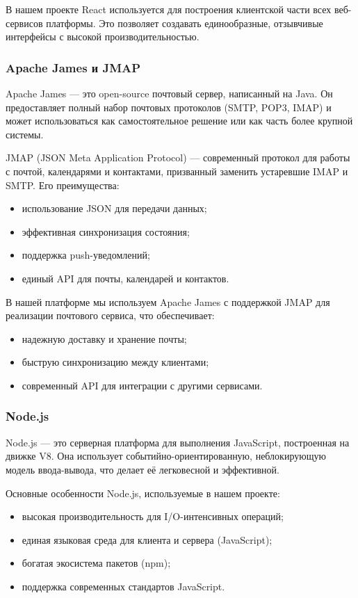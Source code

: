 В нашем проекте React используется для построения клиентской части всех веб-сервисов платформы. Это позволяет создавать единообразные, отзывчивые интерфейсы с высокой производительностью.

\subsubsection{Apache James и JMAP}
Apache James — это open-source почтовый сервер, написанный на Java. Он предоставляет полный набор почтовых протоколов (SMTP, POP3, IMAP) и может использоваться как самостоятельное решение или как часть более крупной системы.

JMAP (JSON Meta Application Protocol) — современный протокол для работы с почтой, календарями и контактами, призванный заменить устаревшие IMAP и SMTP. Его преимущества:
\begin{itemize}
\item использование JSON для передачи данных;
\item эффективная синхронизация состояния;
\item поддержка push-уведомлений;
\item единый API для почты, календарей и контактов.
\end{itemize}

В нашей платформе мы используем Apache James с поддержкой JMAP для реализации почтового сервиса, что обеспечивает:
\begin{itemize}
\item надежную доставку и хранение почты;
\item быструю синхронизацию между клиентами;
\item современный API для интеграции с другими сервисами.
\end{itemize}

\subsubsection{Node.js}
Node.js — это серверная платформа для выполнения JavaScript, построенная на движке V8. Она использует событийно-ориентированную, неблокирующую модель ввода-вывода, что делает её легковесной и эффективной.

Основные особенности Node.js, используемые в нашем проекте:
\begin{itemize}
\item высокая производительность для I/O-интенсивных операций;
\item единая языковая среда для клиента и сервера (JavaScript);
\item богатая экосистема пакетов (npm);
\item поддержка современных стандартов JavaScript.
\end{itemize}

